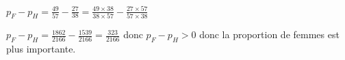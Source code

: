 \begin{enumerate}
\begin{enumerate}
\begin{enumerate}
$p_F - p_H=\frac{49}{57} - \frac{27}{38} =\frac{49 \times 38}{38\times 57} - \frac{27\times 57}{57\times 38}$

$p_F - p_H=\frac{1862}{2166} - \frac{1539}{2166} =\frac{323}{2166}$ donc $p_F - p_H >0$ donc la proportion de femmes est plus importante.


\end{enumerate}


\end{enumerate}
\end{enumerate} 